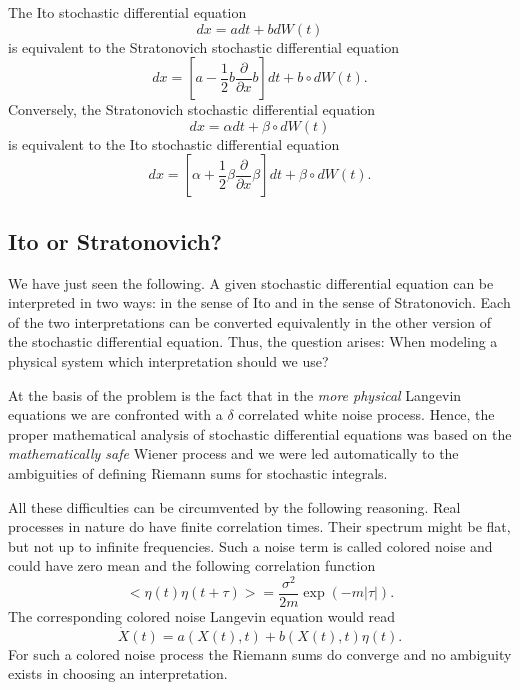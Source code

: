 The Ito stochastic differential equation
\begin{equation}
dx = a dt + b dW(t)
\end{equation}
is equivalent to the Stratonovich stochastic differential equation
\begin{equation}
dx = [a- \frac{1}{2} b \frac{\partial}{\partial x}b] dt + b \circ 
dW(t).
\end{equation}
Conversely, the Stratonovich stochastic differential equation
\begin{equation*}
dx = \alpha dt + \beta \circ dW(t)
\end{equation*}
is equivalent to the Ito stochastic differential equation
\begin{equation*}
dx = [\alpha + \frac{1}{2} \beta \frac{\partial}{\partial x} 
\beta]dt + \beta \circ dW(t).
\end{equation*}

\subsection{Ito or Stratonovich?}
We have just seen the following. A given stochastic differential 
equation can be interpreted in two ways: in the sense of Ito and 
in the sense of Stratonovich. Each of the two interpretations can be converted
equivalently in the other version of the stochastic differential 
equation. Thus, the question arises: When modeling a physical 
system which interpretation should we use? 

At the basis of the problem is the fact that 
in the {\em more physical} Langevin equations we are confronted
with a $\delta$ correlated white noise process.
Hence, the proper 
mathematical analysis of stochastic differential equations was based 
on the {\em mathematically safe} Wiener process and we were led
automatically to the ambiguities of defining Riemann sums for 
stochastic integrals.

All these difficulties can be circumvented by the following 
reasoning. Real processes in nature do have finite correlation 
times. Their spectrum might be flat, but not up to infinite 
frequencies. Such a noise term is called colored  noise and could 
have zero mean and the following correlation function
\begin{equation*}
< \eta(t) \eta(t+\tau) > = \frac{\sigma^2}{2m} \exp(- m |\tau|).
\end{equation*}
The corresponding colored noise Langevin equation would read
\begin{equation}
\dot{X}(t) = a(X(t),t) + b(X(t),t) \eta(t).
\end{equation}
For such a colored noise process the Riemann sums do converge and 
no ambiguity exists in choosing an interpretation.

